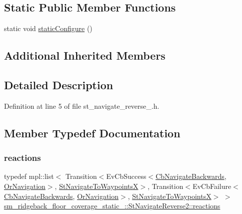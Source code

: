 \subsection*{Static Public Member Functions}
\begin{DoxyCompactItemize}
\item 
static void \hyperlink{structsm__ridgeback__floor__coverage__static__1_1_1StNavigateReverse2_a471cc803170e9e053d9f497c29120e75}{static\+Configure} ()
\end{DoxyCompactItemize}
\subsection*{Additional Inherited Members}


\subsection{Detailed Description}


Definition at line 5 of file st\+\_\+navigate\+\_\+reverse\+\_.\+h.



\subsection{Member Typedef Documentation}
\mbox{\label{structsm__ridgeback__floor__coverage__static__1_1_1StNavigateReverse2_af8b306f6a2285c4c25c7e68e823ebaad}} 
\subsubsection{\texorpdfstring{reactions}{reactions}}
{\footnotesize\ttfamily typedef mpl\+::list$<$ Transition$<$Ev\+Cb\+Success$<$\hyperlink{classcl__move__base__z_1_1CbNavigateBackwards}{Cb\+Navigate\+Backwards}, \hyperlink{classsm__ridgeback__floor__coverage__static__1_1_1OrNavigation}{Or\+Navigation}$>$, \hyperlink{structsm__ridgeback__floor__coverage__static__1_1_1StNavigateToWaypointsX}{St\+Navigate\+To\+WaypointsX}$>$, Transition$<$Ev\+Cb\+Failure$<$\hyperlink{classcl__move__base__z_1_1CbNavigateBackwards}{Cb\+Navigate\+Backwards}, \hyperlink{classsm__ridgeback__floor__coverage__static__1_1_1OrNavigation}{Or\+Navigation}$>$, \hyperlink{structsm__ridgeback__floor__coverage__static__1_1_1StNavigateToWaypointsX}{St\+Navigate\+To\+WaypointsX}$>$ $>$ \hyperlink{structsm__ridgeback__floor__coverage__static__1_1_1StNavigateReverse2_af8b306f6a2285c4c25c7e68e823ebaad}{sm\+\_\+ridgeback\+\_\+floor\+\_\+coverage\+\_\+static\+\_\+::\+St\+Navigate\+Reverse2\+::reactions}}



